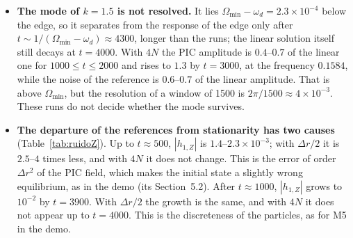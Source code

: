\documentclass[11pt,a4paper]{article}
\begin{document}
\begin{itemize}
minimum, $0.90$, is at $t\approx2250$. With $\varepsilon=0.1$ it was $0.53$--$0.63$ at $t\approx1350$ and
with $\varepsilon=0.3$, $0.32$ at $t\approx630$: the dip becomes shallower and later as $\varepsilon$
decreases. A pole fitted over $300\le t\le1000$ and over $300\le t\le1500$ gives the same frequency,
$0.15314$, with $|\gamma|\le3\times10^{-5}$; the linear solution gives $0.15330$--$0.15332$ and the
loop gain $0.15326$. With $10^4$ and $4\times10^4$ particles the fitted frequency changed with the
window ($0.15292$ and $0.15326$; $0.15190$ and $0.15325$). The difference
$\max|h_1-h_1^{\rm lin}|/\max|h_1^{\rm lin}|$ is $0.10$ over $500\le t\le1000$ and $0.23$ over
$1500\le t\le2000$, of which $0.07$ and $0.12$ are in the modulus; a frequency lower by
$1.6\times10^{-4}$ shifts the phase by $0.16$ and $0.32$ at $t=1000$ and $2000$. The reference
stays at $|h_{1,Z}|=1.4\times10^{-3}$ from $t=500$ to $t=3900$, and the rms displacement of the
action of its particles is $0.46$, $0.41$ and $0.56\times10^{-3}J_t$ at $t=1000$, $2000$ and
$4000$, against $1.4$, $6.3$ and $37$ with $10^4$ particles and $0.50$, $0.58$ and $2.5$ with
$4\times10^4$ (\texttt{relajacion\_N.py}).
\item \textbf{The mode of $k=1.5$ is not resolved.} It lies $\Omega_{\min}-\omega_d=2.3\times10^{-4}$
below the edge, so it separates from the response of the edge only after
$t\sim1/(\Omega_{\min}-\omega_d)\approx4300$, longer than the runs; the linear solution itself still
decays at $t=4000$. With $4N$ the PIC amplitude is $0.4$--$0.7$ of the linear one for
$1000\le t\le2000$ and rises to $1.3$ by $t=3000$, at the frequency $0.1584$, while the noise of
the reference is $0.6$--$0.7$ of the linear amplitude. That is above
$\Omega_{\min}$, but the resolution of a window of 1500 is $2\pi/1500\approx4\times10^{-3}$. These runs
do not decide whether the mode survives.
\item \textbf{The departure of the references from stationarity has two causes}
(Table~\ref{tab:ruidoZ}). Up to $t\approx500$, $|h_{1,Z}|$ is $1.4$--$2.3\times10^{-3}$; with $\Delta r/2$
it is $2.5$--$4$ times less, and with $4N$ it does not change. This is the error of order
$\Delta r^2$ of the PIC field, which makes the initial state a slightly wrong equilibrium, as in
the demo (its Section~5.2). After $t\approx1000$, $|h_{1,Z}|$ grows to $10^{-2}$ by $t=3900$. With
$\Delta r/2$ the growth is the same, and with $4N$ it does not appear up to $t=4000$. This is the
discreteness of the particles, as for M5 in the demo.
\end{itemize}
\end{document}
